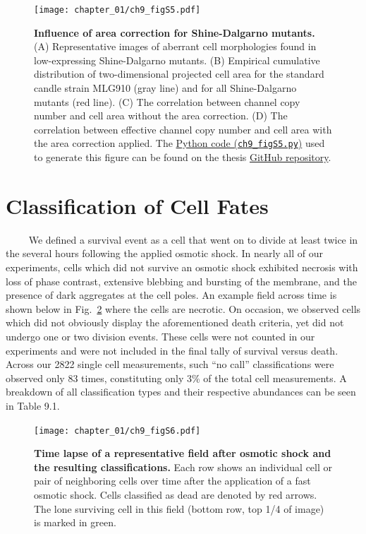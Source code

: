 \documentclass[12pt]{caltech_thesis}
\begin{document}
\hypertarget{fig:area_correction}{%
\begin{figure}
\centering
\texttt{[image: chapter\_01/ch9\_figS5.pdf]}
\caption[{Influence of area correction for Shine-Dalgarno
mutants.}]{\textbf{Influence of area correction for Shine-Dalgarno
mutants.} (A) Representative images of aberrant cell morphologies found
in low-expressing Shine-Dalgarno mutants. (B) Empirical cumulative
distribution of two-dimensional projected cell area for the standard
candle strain MLG910 (gray line) and for all Shine-Dalgarno mutants (red
line). (C) The correlation between channel copy number and cell area
without the area correction. (D) The correlation between effective
channel copy number and cell area with the area correction applied. The
\href{https://github.com/gchure/phd/blob/master/src/chapter_09/code/ch9_figS5.py}{Python
code (\texttt{ch9\_figS5.py})} used to generate this figure can be found
on the thesis \href{https://github.com/gchure/phd}{GitHub repository}.}
\label{fig:area_correction}
\end{figure}
}

\hypertarget{classification-of-cell-fates}{%
\section{Classification of Cell
Fates}\label{classification-of-cell-fates}}

~~~~ We defined a survival event as a cell that went on to divide at
least twice in the several hours following the applied osmotic shock. In
nearly all of our experiments, cells which did not survive an osmotic
shock exhibited necrosis with loss of phase contrast, extensive blebbing
and bursting of the membrane, and the presence of dark aggregates at the
cell poles. An example field across time is shown below in
Fig.~\ref{fig:phase_death} where the cells are necrotic. On occasion, we
observed cells which did not obviously display the aforementioned death
criteria, yet did not undergo one or two division events. These cells
were not counted in our experiments and were not included in the final
tally of survival versus death. Across our 2822 single cell
measurements, such ``no call'' classifications were observed only 83
times, constituting only 3\% of the total cell measurements. A breakdown
of all classification types and their respective abundances can be seen
in Table 9.1.

\hypertarget{fig:phase_death}{%
\begin{figure}
\centering
\texttt{[image: chapter\_01/ch9\_figS6.pdf]}
\caption[{Time lapse of a representative field after osmotic shock and
the resulting classifications.}]{\textbf{Time lapse of a representative
field after osmotic shock and the resulting classifications.} Each row
shows an individual cell or pair of neighboring cells over time after
the application of a fast osmotic shock. Cells classified as dead are
denoted by red arrows. The lone surviving cell in this field (bottom
row, top 1/4 of image) is marked in green.}
\label{fig:phase_death}
\end{figure}
}
\end{document}
